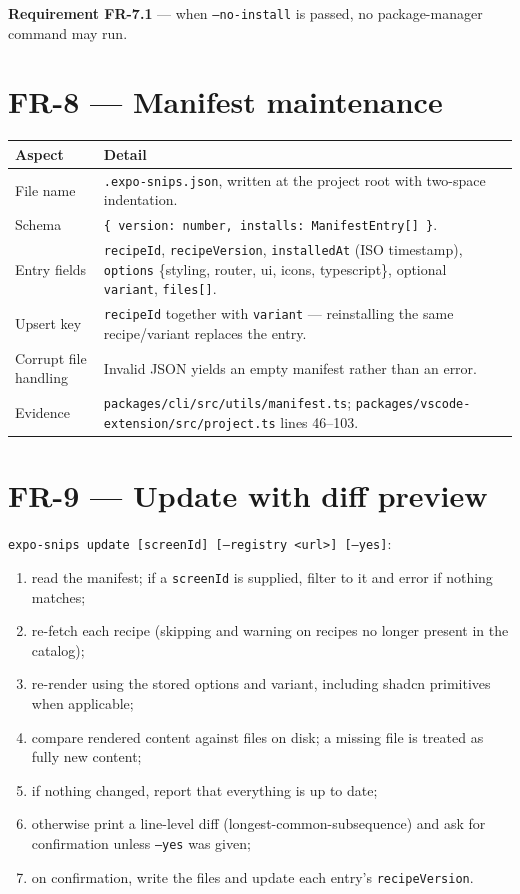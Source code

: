 \textbf{Requirement FR-7.1} --- when \texttt{--no-install} is passed, no
package-manager command may run.

\section{FR-8 --- Manifest maintenance}

\begin{longtable}{@{}L{3.4cm}L{10.6cm}@{}}
\toprule
\textbf{Aspect} & \textbf{Detail} \\
\midrule
\endhead
File name & \texttt{.expo-snips.json}, written at the project root with two-space indentation. \\
Schema & \texttt{\{ version: number, installs: ManifestEntry[] \}}. \\
Entry fields & \texttt{recipeId}, \texttt{recipeVersion}, \texttt{installedAt}
(ISO timestamp), \texttt{options} \{styling, router, ui, icons, typescript\},
optional \texttt{variant}, \texttt{files[]}. \\
Upsert key & \texttt{recipeId} together with \texttt{variant} --- reinstalling the
same recipe/variant replaces the entry. \\
Corrupt file handling & Invalid JSON yields an empty manifest rather than an error. \\
Evidence & \texttt{packages/cli/src/utils/manifest.ts};
\texttt{packages/vscode-extension/src/project.ts} lines 46--103. \\
\bottomrule
\end{longtable}

\section{FR-9 --- Update with diff preview}

\texttt{expo-snips update [screenId] [--registry <url>] [--yes]}:

\begin{enumerate}
  \item read the manifest; if a \texttt{screenId} is supplied, filter to it and
        error if nothing matches;
  \item re-fetch each recipe (skipping and warning on recipes no longer present in
        the catalog);
  \item re-render using the stored options and variant, including shadcn primitives
        when applicable;
  \item compare rendered content against files on disk; a missing file is treated
        as fully new content;
  \item if nothing changed, report that everything is up to date;
  \item otherwise print a line-level diff (longest-common-subsequence) and ask for
        confirmation unless \texttt{--yes} was given;
  \item on confirmation, write the files and update each entry's
        \texttt{recipeVersion}.
\end{enumerate}

